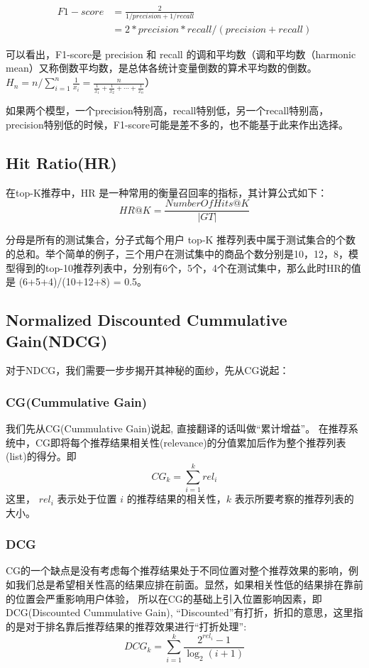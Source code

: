 \documentclass[12pt]{article}
\begin{document}
\begin{align*}
F1-score &= \frac{2}{1/precision + 1/recall}\\
     &= 2 * precision * recall / (precision + recall) 
\end{align*}

可以看出，F1-score是 precision 和 recall 的调和平均数（调和平均数（harmonic mean）又称倒数平均数，是总体各统计变量倒数的算术平均数的倒数。$H_n = n/\sum_{i=1}^n\frac{1}{x_i} = \frac{n}{\frac{1}{x_1} + \frac{1}{x_2} + \cdots + \frac{1}{x_n}}$）

如果两个模型，一个precision特别高，recall特别低，另一个recall特别高，precision特别低的时候，F1-score可能是差不多的，也不能基于此来作出选择。

\subsection{Hit Ratio(HR)\cite{Common_Evaluation_Index_In_Recommender_System}}
在top-K推荐中，HR 是一种常用的衡量召回率的指标，其计算公式如下：
$$
HR@K = \frac{NumberOfHits@K}{|GT|}
$$

分母是所有的测试集合，分子式每个用户 top-K 推荐列表中属于测试集合的个数的总和。举个简单的例子，三个用户在测试集中的商品个数分别是10，12，8，模型得到的top-10推荐列表中，分别有6个，5个，4个在测试集中，那么此时HR的值是 (6+5+4)/(10+12+8) = 0.5。

\subsection{Normalized Discounted Cummulative Gain(NDCG)\cite{Common_Evaluation_Index_In_Recommender_System}}
对于NDCG，我们需要一步步揭开其神秘的面纱，先从CG说起：

\subsubsection{CG(Cummulative Gain)}
我们先从CG(Cummulative Gain)说起, 直接翻译的话叫做“累计增益”。 在推荐系统中，CG即将每个推荐结果相关性(relevance)的分值累加后作为整个推荐列表(list)的得分。即
$$
CG_k = \sum_{i=1}^krel_i
$$
这里， $rel_i$ 表示处于位置 $i$ 的推荐结果的相关性，$k$ 表示所要考察的推荐列表的大小。

\subsubsection{DCG}
CG的一个缺点是没有考虑每个推荐结果处于不同位置对整个推荐效果的影响，例如我们总是希望相关性高的结果应排在前面。显然，如果相关性低的结果排在靠前的位置会严重影响用户体验， 所以在CG的基础上引入位置影响因素，即DCG(Discounted Cummulative Gain), “Discounted”有打折，折扣的意思，这里指的是对于排名靠后推荐结果的推荐效果进行“打折处理”:
$$
DCG_k = \sum_{i=1}^k\frac{2^{rel_i} - 1}{\log_2(i+1)}
$$
\end{document}
